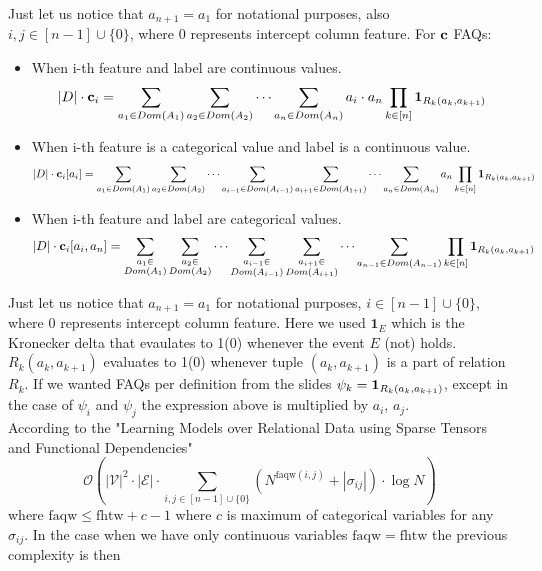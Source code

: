 \documentclass[10pt,a4paper]{article}
\begin{document}
\begin{enumerate}
\begin{itemize}
\end{itemize}
Just let us notice that $a_{n+1}=a_1$ for notational purposes, also $i, j \in [n-1] \cup \{0\} $, where $0$ represents intercept column feature. 
For $\textbf{\text{{c}}}$ FAQs:
\begin{itemize}
\item When i-th feature and label are  continuous values. 
$$|D| \cdot \mathbf{c}_{i}= \sum_{a_1 \in Dom(A_1)} \sum_{a_2 \in Dom(A_2)} \cdots \sum_{a_n \in Dom(A_n)} a_i \cdot a_n 
\prod_{k\in[n]} \textbf{\text{{1}}}_{R_k(a_k, a_{k+1})}$$
\item When i-th feature is a categorical value and label is a continuous value. 
$$|D| \cdot \mathbf{c}_{i}[a_i]= \sum_{a_1 \in Dom(A_1)} \sum_{a_2 \in Dom(A_2)} \cdots 
\sum_{a_{i-1} \in Dom(A_{i-1})}
\sum_{a_{i+1} \in Dom(A_{1+1})}
\cdots
\sum_{a_n \in Dom(A_n)}  a_n 
\prod_{k\in[n]} \textbf{\text{{1}}}_{R_k(a_k, a_{k+1})}$$
\item When i-th feature and label are categorical values. 
$$|D| \cdot \mathbf{c}_{i}[a_i, a_n]= 
\sum_{\substack{a_{1} \in \\Dom(A_{1})}}
\sum_{\substack{a_{2} \in \\Dom(A_{2})}}
\cdots 
\sum_{\substack{a_{i-1} \in \\Dom(A_{i-1})}}
\sum_{\substack{a_{i+1} \in \\Dom(A_{i+1})}}
\cdots
\sum_{a_{n-1} \in Dom(A_{n-1})}  
\prod_{k\in[n]} \textbf{\text{{1}}}_{R_k(a_k, a_{k+1})}$$
\end{itemize}
Just let us notice that $a_{n+1}=a_1$ for notational purposes, $i \in [n-1] \cup \{0\} $, where $0$ represents intercept column feature. 
Here we used $\mathbf{1}_E$ which is the Kronecker delta that evaulates to 1(0) whenever the event $E$ (not) holds. $R_k(a_k, a_{k+1})$ evaluates to 1(0) whenever tuple $(a_k, a_{k+1})$ is a part of relation $R_k$. If we wanted FAQs per definition from the slides $\psi_k=\textbf{\text{{1}}}_{R_k(a_k, a_{k+1})}$, except in the case of $\psi_{i}$ and $\psi_j$ the expression above is multiplied by $a_i$, $a_j$.
\\
According to the "Learning Models over Relational Data
using Sparse Tensors and Functional Dependencies" 
$$
\mathcal{O}\left(|\mathcal{V}|^{2} \cdot|\mathcal{E}| \cdot \sum_{i, j \in[n-1]\cup\{0\}}\left(N^{\mathrm{faqw}(i, j)}+\left|\sigma_{i j}\right|\right) \cdot \log N\right)
 $$
 where $ \mathrm{faqw} \leq \mathrm{fhtw} + c - 1$ where $c$ is maximum of categorical variables for any $\sigma_{ij}$. In the case when we have only continuous variables $\mathrm{faqw} =\mathrm{fhtw}$ the previous complexity is then 

\end{enumerate}
\end{document}
